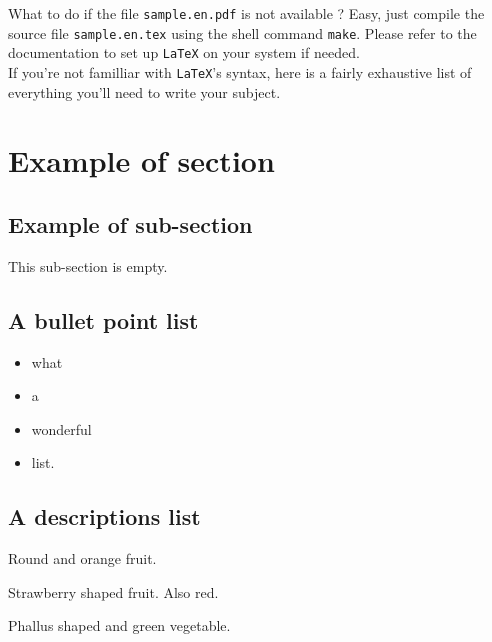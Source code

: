 \documentclass{42-en}
\begin{document}
    What to do if the file \texttt{sample.en.pdf} is not available ?
    Easy, just compile the source file \texttt{sample.en.tex} using
    the shell command \texttt{make}. Please refer to the documentation
    to set up \texttt{LaTeX} on your system if needed.\\

    If you're not familliar with \texttt{LaTeX}'s syntax, here is a
    fairly exhaustive list of everything you'll need to write your
    subject.\\


    \section{Example of section}


        \subsection{Example of sub-section}

           This sub-section is empty.


        \newpage


        \subsection{A bullet point list}

            \begin{itemize}\itemsep1pt
                \item what
                \item a
                \item wonderful
                \item list.\\
            \end{itemize}


        \subsection{A descriptions list}

            \begin{description}\itemsep3pt
                \item [Orange:] Round and orange fruit.
                \item [Strawberry:] Strawberry shaped fruit. Also red.
                \item [Cucumber:] Phallus shaped and green vegetable.\\
            \end{description}
\end{document}
